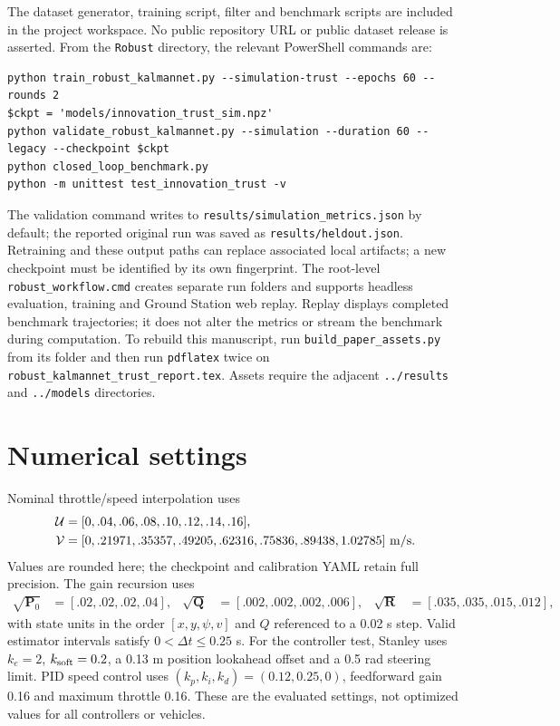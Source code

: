 ﻿\documentclass[10pt,a4paper]{article}
\begin{document}
The dataset generator, training script, filter and benchmark scripts are included in the
project workspace. No public repository URL or public dataset release is asserted.
From the \texttt{Robust} directory, the relevant PowerShell commands are:
\begin{verbatim}
python train_robust_kalmannet.py --simulation-trust --epochs 60 --rounds 2
$ckpt = 'models/innovation_trust_sim.npz'
python validate_robust_kalmannet.py --simulation --duration 60 --legacy --checkpoint $ckpt
python closed_loop_benchmark.py
python -m unittest test_innovation_trust -v
\end{verbatim}
The validation command writes to \texttt{results/simulation\_metrics.json} by default;
the reported original run was saved as \texttt{results/heldout.json}.
Retraining and these output paths can replace associated local artifacts; a new checkpoint
must be identified by its own fingerprint.
The root-level \texttt{robust\_workflow.cmd} creates separate run folders and supports
headless evaluation, training and Ground Station web replay.
Replay displays completed benchmark trajectories; it does not alter the metrics or
stream the benchmark during computation.
To rebuild this manuscript, run \texttt{build\_paper\_assets.py} from its folder and then
run \texttt{pdflatex} twice on \texttt{robust\_kalmannet\_trust\_report.tex}.
Assets require the adjacent \texttt{../results} and \texttt{../models} directories.

\appendix
\section{Numerical settings}\label{app:parameters}
Nominal throttle/speed interpolation uses
\begin{align*}
\mathcal U&=[0,.04,.06,.08,.10,.12,.14,.16],\\
\mathcal V&=[0,.21971,.35357,.49205,.62316,.75836,.89438,1.02785]\ {\rm m/s}.
\end{align*}
Values are rounded here; the checkpoint and calibration YAML retain full precision.
The gain recursion uses
\begin{align*}
 \sqrt{\bm P_0}&=[.02,.02,.02,.04],&
 \sqrt{\bm Q}&=[.002,.002,.002,.006],&
 \sqrt{\bm R}&=[.035,.035,.015,.012],
\end{align*}
with state units in the order $[x,y,\psi,v]$ and $Q$ referenced to a 0.02 s step.
Valid estimator intervals satisfy $0<\Delta t\leq0.25$ s.
For the controller test, Stanley uses $k_e=2$, $k_{\rm soft}=0.2$,
a 0.13 m position lookahead offset and a 0.5 rad steering limit.
PID speed control uses $(k_p,k_i,k_d)=(0.12,0.25,0)$,
feedforward gain 0.16 and maximum throttle 0.16.
These are the evaluated settings, not optimized values for all controllers or vehicles.
\end{document}
